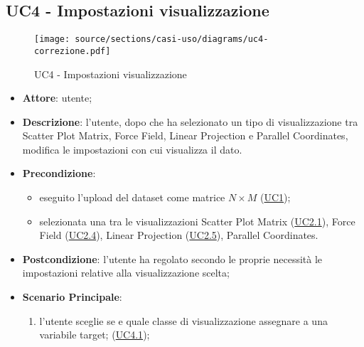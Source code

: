 \subsection{UC4 - Impostazioni visualizzazione}
\label{uc4}

\begin{figure}[htbp]
        \centering
        \texttt{[image: source/sections/casi-uso/diagrams/uc4-correzione.pdf]}
        \caption{UC4 - Impostazioni visualizzazione}
        \label{fig:uc4}
    \end{figure}

\begin{itemize}
    \item \textbf{Attore}: utente;
    \item \textbf{Descrizione}: l'utente, dopo che ha selezionato un tipo di visualizzazione tra Scatter Plot Matrix, Force Field, Linear Projection e Parallel Coordinates, modifica le impostazioni con cui visualizza il dato.
    \item \textbf{Precondizione}: 
    \begin{itemize}
        \item eseguito l'upload del dataset come matrice $N\times M$ (\hyperref[uc1]{UC1});
        \item selezionata una tra le visualizzazioni Scatter Plot Matrix (\hyperref[uc2.1]{UC2.1}), Force Field (\hyperref[uc2.4]{UC2.4}), Linear Projection (\hyperref[uc2.5]{UC2.5}), Parallel Coordinates.
    \end{itemize}  
    \item \textbf{Postcondizione}: l'utente ha regolato secondo le proprie necessità le impostazioni relative alla visualizzazione scelta;
    \item \textbf{Scenario Principale}: 
    \begin{enumerate}
        \item l'utente sceglie se e quale classe di visualizzazione assegnare a una variabile target; (\hyperref[uc4.1]{UC4.1});
    \end{enumerate}  
    \end{itemize}


